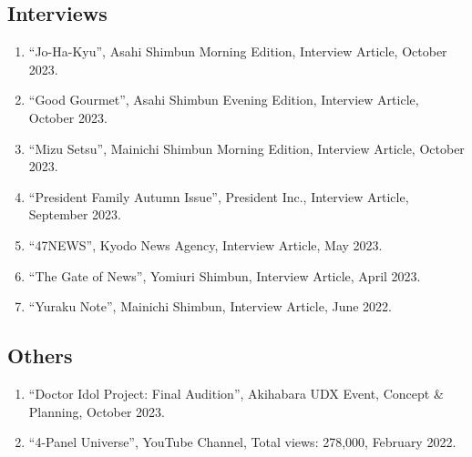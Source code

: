 \documentclass[uplatex, 12pt]{article}
\begin{document}
\subsection*{Interviews}
\begin{enumerate}
\item “Jo-Ha-Kyu”, Asahi Shimbun Morning Edition, Interview Article, October 2023.
\item “Good Gourmet”, Asahi Shimbun Evening Edition, Interview Article, October 2023.
\item “Mizu Setsu”, Mainichi Shimbun Morning Edition, Interview Article, October 2023.
\item “President Family Autumn Issue”, President Inc., Interview Article, September 2023.
\item “47NEWS”, Kyodo News Agency, Interview Article, May 2023.
\item “The Gate of News”, Yomiuri Shimbun, Interview Article, April 2023.
\item “Yuraku Note”, Mainichi Shimbun, Interview Article, June 2022.
\end{enumerate}
\subsection*{Others}
\begin{enumerate}
\item “Doctor Idol Project: Final Audition”, Akihabara UDX Event, Concept & Planning, October 2023.
\item “4-Panel Universe”, YouTube Channel, Total views: 278,000, February 2022.
\end{enumerate}

\end{document}

